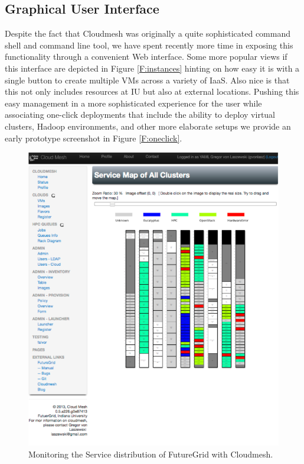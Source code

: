 \documentclass[graybox]{svmult}
\begin{document}
\subsection{Graphical User Interface}


Despite the fact that Cloudmesh was originally a quite sophisticated command shell and command line tool, we have spent recently more time in exposing this functionality through a convenient Web interface. Some more popular views if this interface are depicted in Figure \ref{F:instances} hinting on how easy it is with a single button to create multiple VMs across a variety of IaaS. Also nice is that this not only includes resources at IU but also at external locations. Pushing this easy management in a more sophisticated experience for the user while associating one-click deployments that include the ability to deploy virtual clusters, Hadoop environments, and other more elaborate setups we provide an early prototype screenshot in Figure \ref{F:oneclick}.


\begin{figure}[htb]
  \centering
    \includegraphics[width=.7\textwidth]{images/rainbow.pdf}
  \caption{Monitoring the Service distribution of FutureGrid with Cloudmesh.}
\end{figure}
\end{document}
